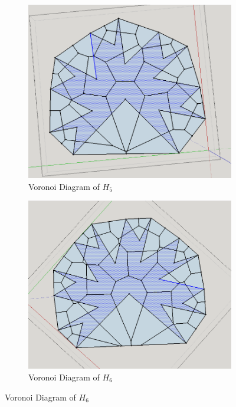 \documentclass[12 pt]{article}
\begin{document}
\begin{figure}[h]
\centering
	\begin{subfigure}[t]{0.4\textwidth}
	\caption{Voronoi Diagram of $H_5$}
	\includegraphics[scale=0.2]{vDiags/h5Voronoi.png}
	\end{subfigure}
	
	\begin{subfigure}[t]{0.4\textwidth}
	\caption{Voronoi Diagram of $H_6$}
	\includegraphics[scale=0.2]{vDiags/h6Voronoi.png}
	\end{subfigure}
	
\end{figure}
\newpage
\end{document}
